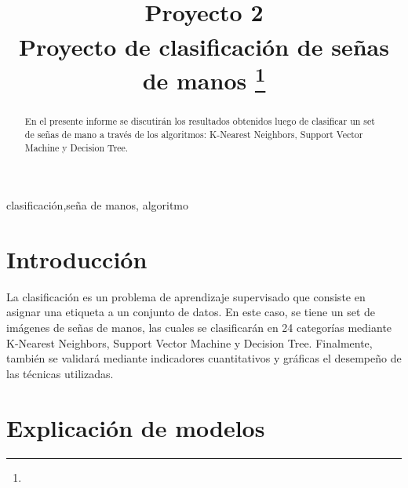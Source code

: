 \documentclass[conference]{IEEEtran}
\begin{document}
\title{Proyecto 2\\
{\footnotesize \textsuperscript{}Proyecto de clasificación de señas de manos}
\thanks{}
}

\author{
\and
{}
}

\maketitle

\begin{abstract}
En el presente informe se discutirán los resultados obtenidos luego de clasificar un set de señas de mano a través de los algoritmos:
K-Nearest Neighbors, Support Vector Machine y Decision Tree.
\end{abstract}

\begin{IEEEkeywords}
clasificación,seña de manos, algoritmo
\end{IEEEkeywords}

\section{Introducción}
La clasificación es un problema de aprendizaje supervisado que consiste en asignar una etiqueta a un conjunto de datos.
En este caso, se tiene un set de imágenes de señas de manos, las cuales se clasificarán en 24 categorías mediante K-Nearest Neighbors,
Support Vector Machine y Decision Tree. Finalmente, también se validará mediante indicadores cuantitativos y gráficas el desempeño de las técnicas utilizadas.

\section{Explicación de modelos}
\end{document}

